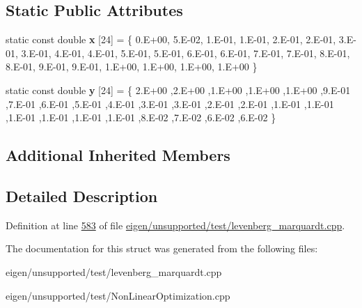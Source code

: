 \subsection*{Static Public Attributes}
\begin{DoxyCompactItemize}
\item 
\mbox{\label{structlanczos1__functor_a2dca80e3a916d2c6891c23d901a3a965}} 
static const double {\bfseries x} \mbox{[}24\mbox{]} = \{ 0.\+E+00, 5.\+E-\/02, 1.\+E-\/01, 1.\+E-\/01, 2.\+E-\/01, 2.\+E-\/01, 3.\+E-\/01, 3.\+E-\/01, 4.\+E-\/01, 4.\+E-\/01, 5.\+E-\/01, 5.\+E-\/01, 6.\+E-\/01, 6.\+E-\/01, 7.\+E-\/01, 7.\+E-\/01, 8.\+E-\/01, 8.\+E-\/01, 9.\+E-\/01, 9.\+E-\/01, 1.\+E+00, 1.\+E+00, 1.\+E+00, 1.\+E+00 \}
\item 
\mbox{\label{structlanczos1__functor_a36a600b94983935eb43cf51bd58392ec}} 
static const double {\bfseries y} \mbox{[}24\mbox{]} = \{ 2.\+E+00 ,2.\+E+00 ,1.\+E+00 ,1.\+E+00 ,1.\+E+00 ,9.\+E-\/01 ,7.\+E-\/01 ,6.\+E-\/01 ,5.\+E-\/01 ,4.\+E-\/01 ,3.\+E-\/01 ,3.\+E-\/01 ,2.\+E-\/01 ,2.\+E-\/01 ,1.\+E-\/01 ,1.\+E-\/01 ,1.\+E-\/01 ,1.\+E-\/01 ,1.\+E-\/01 ,1.\+E-\/01 ,8.\+E-\/02 ,7.\+E-\/02 ,6.\+E-\/02 ,6.\+E-\/02 \}
\end{DoxyCompactItemize}
\subsection*{Additional Inherited Members}


\subsection{Detailed Description}


Definition at line \hyperlink{eigen_2unsupported_2test_2levenberg__marquardt_8cpp_source_l00583}{583} of file \hyperlink{eigen_2unsupported_2test_2levenberg__marquardt_8cpp_source}{eigen/unsupported/test/levenberg\+\_\+marquardt.\+cpp}.



The documentation for this struct was generated from the following files\+:\begin{DoxyCompactItemize}
\item 
eigen/unsupported/test/levenberg\+\_\+marquardt.\+cpp\item 
eigen/unsupported/test/\+Non\+Linear\+Optimization.\+cpp\end{DoxyCompactItemize}
